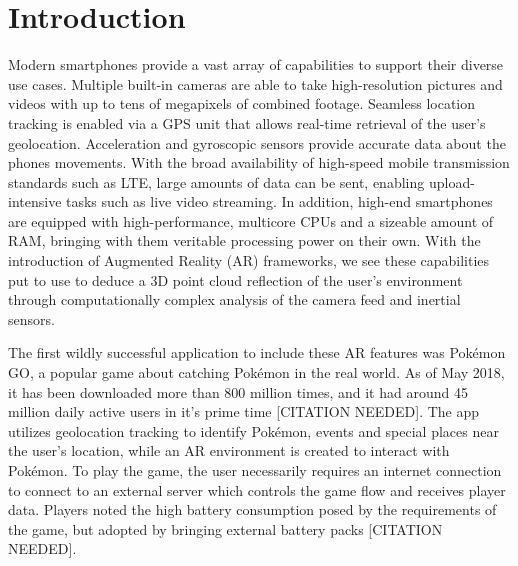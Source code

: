 \section{Introduction}
Modern smartphones provide a vast array of capabilities to support their diverse use cases.
Multiple built-in cameras are able to take high-resolution pictures and videos with up to tens of megapixels of combined footage.
Seamless location tracking is enabled via a GPS unit that allows real-time retrieval of the user's geolocation.
Acceleration and gyroscopic sensors provide accurate data about the phones movements.
With the broad availability of high-speed mobile transmission standards such as LTE, large amounts of data can be sent, enabling upload-intensive tasks such as live video streaming.
In addition, high-end smartphones are equipped with high-performance, multicore CPUs and a sizeable amount of RAM, bringing with them veritable processing power on their own.
With the introduction of Augmented Reality (AR) frameworks, we see these capabilities put to use to deduce a 3D point cloud reflection of the user's environment through computationally complex analysis of the camera feed and inertial sensors.

The first wildly successful application to include these AR features was Pokémon GO, a popular game about catching Pokémon in the real world.
As of May 2018, it has been downloaded more than 800 million times, and it had around 45 million daily active users in it's prime time [CITATION NEEDED].
The app utilizes geolocation tracking to identify Pokémon, events and special places near the user's location, while an AR environment is created to interact with Pokémon.
To play the game, the user necessarily requires an internet connection to connect to an external server which controls the game flow and receives player data.
Players noted the high battery consumption posed by the requirements of the game, but adopted by bringing external battery packs [CITATION NEEDED].

